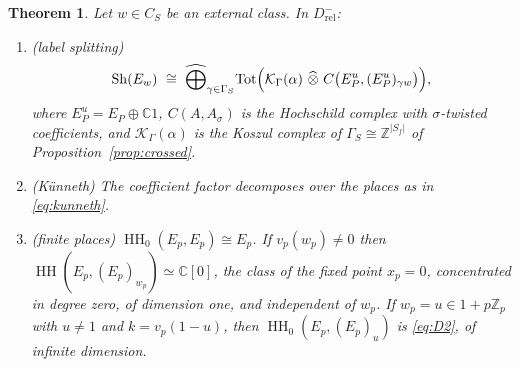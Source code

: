 \documentclass[11pt]{amsart}
\newtheorem{theorem}{Theorem}[section]
\theoremstyle{definition}
\theoremstyle{remark}
\newcommand{\C}{\mathbb C}
\newcommand{\Z}{\mathbb Z}
\newcommand{\HH}{\operatorname{HH}}
\newcommand{\Sh}{\operatorname{Sh}}
\begin{document}
\begin{theorem}\label{thm:shadow}
Let $w\in C_S$ be an external class.  In $D^{-}_{\mathrm{rel}}$:
\begin{enumerate}
\item[(a)] \emph{(label splitting)}
\begin{equation}\label{eq:labelsplit}
\Sh(E_w)\ \cong\ \widehat\bigoplus_{\gamma\in\Gamma_S}
\mathrm{Tot}\Bigl(\mathcal K_{\Gamma}(\alpha)\ \widehat\otimes\
C\bigl(E_P^{u},(E_P^{u})_{\gamma w}\bigr)\Bigr),
\end{equation}
where $E_P^{u}=E_P\oplus\C1$, $C(A,A_{\sigma})$ is the Hochschild
complex with $\sigma$-twisted coefficients, and $\mathcal K_{\Gamma}(\alpha)$
is the Koszul complex of $\Gamma_S\cong\Z^{|S_f|}$ of
Proposition~\ref{prop:crossed}.
\item[(b)] \emph{(K\"unneth)}  The coefficient factor decomposes over the
places as in \eqref{eq:kunneth}.
\item[(c)] \emph{(finite places)}  $\HH_0(E_p,E_p)\cong E_p$.  If
$v_p(w_p)\ne0$ then $\HH(E_p,(E_p)_{w_p})\simeq\C[0]$, the class of the fixed
point $x_p=0$, concentrated in degree zero, of dimension one, and
\emph{independent of $w_p$}.  If $w_p=u\in1+p\Z_p$ with $u\ne1$ and
$k=v_p(1-u)$, then $\HH_0(E_p,(E_p)_u)$ is \eqref{eq:D2}, of infinite
dimension.
\end{enumerate}
\end{theorem}
\end{document}
